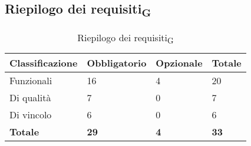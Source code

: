 \subsection{Riepilogo dei requisiti\textsubscript{G}}

\begin{table}[h]
	\centering
	\begin{tabular}{| p{} | p{} | p{} | p{} |} 
		\hline
		\textbf{Classificazione} & \textbf{Obbligatorio} & \textbf{Opzionale} & \textbf{Totale} \\
		\hline
		Funzionali & 16 & 4 & 20\\
		\hline
		Di qualità & 7 & 0 & 7\\
		\hline
		Di vincolo & 6 & 0 & 6\\
		\hline
		\textbf{Totale} & \textbf{29} &\textbf {4} &  \textbf{33}\\
		\hline
	\end{tabular}
	\caption{Riepilogo dei requisiti\textsubscript{G}}
\end{table}
